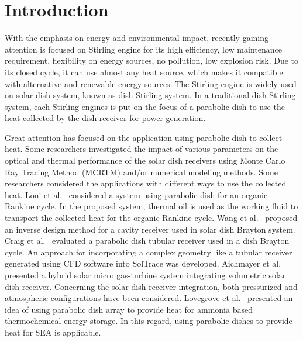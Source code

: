 \documentclass[review,3p,10t]{elsarticle}
\begin{document}
\section{Introduction}
With the emphasis on energy and environmental impact, recently gaining attention is focused on Stirling engine for its high efficiency, low maintenance requirement, flexibility on energy sources, no pollution, low explosion risk. Due to its closed cycle, it can use almost any heat source, which makes it compatible with alternative and renewable energy sources. The Stirling engine is widely used on solar dish system, known as dish-Stirling system. In a traditional dish-Stirling system, each Stirling engines is put on the focus of a parabolic dish to use the heat collected by the dish receiver for power generation. 

Great attention has focused on the application using parabolic dish to collect heat. Some researchers investigated the impact of various parameters on the optical and thermal performance of the solar dish receivers using Monte Carlo Ray Tracing Method (MCRTM) and/or numerical modeling methods.%
Some researchers considered the applications with different ways to use the collected heat. Loni et al.~\cite{Loni2016} considered a system using parabolic dish for an organic Rankine cycle. In the proposed system, thermal oil is used as the working fluid to transport the collected heat for the organic Rankine cycle. Wang et al.~\cite{Wang2014} proposed an inverse design method for a cavity receiver used in solar dish Brayton system. Craig et al.~\cite{Craig2016} evaluated a parabolic dish tubular receiver used in a dish Brayton cycle. An approach for incorporating a complex geometry like a tubular receiver generated using CFD software into SolTrace was developed. Aichmayer et al.~\cite{Aichmayer2015} presented a hybrid solar micro gas-turbine system integrating volumetric solar dish receiver. Concerning the solar dish receiver integration, both pressurized and atmospheric configurations have been considered. Lovegrove et al.~\cite{Lovegrove2004} presented an idea of using parabolic dish array to provide heat for ammonia based thermochemical energy storage. In this regard, using parabolic dishes to provide heat for SEA is applicable.
\end{document}
